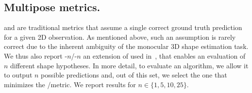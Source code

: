 




\subsection{Multipose metrics.}

\MPJPE and \RE are traditional metrics that assume a single correct ground truth prediction for a given 2D observation.
As mentioned above, such an assumption is rarely correct due to the inherent ambiguity of the monocular 3D shape estimation task.
We thus also report \MPJPE-$n$/\RE-$n$ an extension of \MPJPE\RE used in~\cite{li19generating}, that enables an evaluation of $n$ different shape hypotheses.
In more detail, to evaluate an algorithm, we allow it to output $n$ possible predictions and, out of this set, we select the one that minimizes the \MPJPE/\RE metric.
We report results for $n\in \{1,5,10,25\}$.





